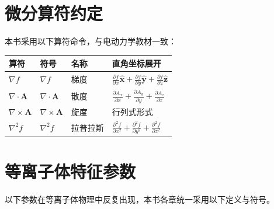 \documentclass[12pt,a4paper,openany,oneside]{book}
\newcommand{\vect}[1]{\bm{#1}}
\newcommand{\unitvec}[1]{\hat{\vect{#1}}}
\newcommand{\grad}{\nabla}
\newcommand{\curl}{\nabla\times}
\newcommand{\divg}{\nabla\cdot}
\newcommand{\lap}{\nabla^2}
\begin{document}
\section*{微分算符约定}
{}

本书采用以下算符命令，与电动力学教材一致：
\begin{table}[htbp]
\centering
\small
\begin{tabular}{@{}lllp{6.6cm}@{}}
\toprule
\textbf{算符} & \textbf{符号} & \textbf{名称} & \textbf{直角坐标展开} \\
\midrule
$\grad f$ & $\nabla f$ & 梯度 & $\frac{\partial f}{\partial x}\unitvec{x}+\frac{\partial f}{\partial y}\unitvec{y}+\frac{\partial f}{\partial z}\unitvec{z}$ \\
$\divg\vect{A}$ & $\nabla\cdot\vect{A}$ & 散度 & $\frac{\partial A_x}{\partial x}+\frac{\partial A_y}{\partial y}+\frac{\partial A_z}{\partial z}$ \\
$\curl\vect{A}$ & $\nabla\times\vect{A}$ & 旋度 & 行列式形式 \\
$\lap f$ & $\nabla^2 f$ & 拉普拉斯 & $\frac{\partial^2 f}{\partial x^2}+\frac{\partial^2 f}{\partial y^2}+\frac{\partial^2 f}{\partial z^2}$ \\
\bottomrule
\end{tabular}
\end{table}


\section*{等离子体特征参数}
{}

以下参数在等离子体物理中反复出现，本书各章统一采用以下定义与符号。
\end{document}
